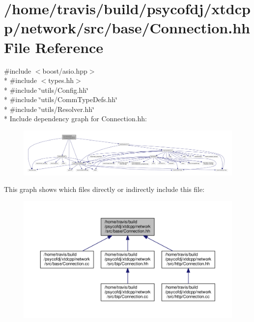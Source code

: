 \hypertarget{base_2Connection_8hh}{\section{/home/travis/build/psycofdj/xtdcpp/network/src/base/\-Connection.hh File Reference}
\label{base_2Connection_8hh}
}
{\ttfamily \#include $<$boost/asio.\-hpp$>$}\\*
{\ttfamily \#include $<$types.\-hh$>$}\\*
{\ttfamily \#include \char`\"{}utils/\-Config.\-hh\char`\"{}}\\*
{\ttfamily \#include \char`\"{}utils/\-Comm\-Type\-Defs.\-hh\char`\"{}}\\*
{\ttfamily \#include \char`\"{}utils/\-Resolver.\-hh\char`\"{}}\\*
Include dependency graph for Connection.\-hh\-:
\nopagebreak
\begin{figure}[H]
\begin{center}
\leavevmode
\includegraphics[width=350pt]{base_2Connection_8hh__incl}
\end{center}
\end{figure}
This graph shows which files directly or indirectly include this file\-:
\nopagebreak
\begin{figure}[H]
\begin{center}
\leavevmode
\includegraphics[width=350pt]{base_2Connection_8hh__dep__incl}
\end{center}
\end{figure}
